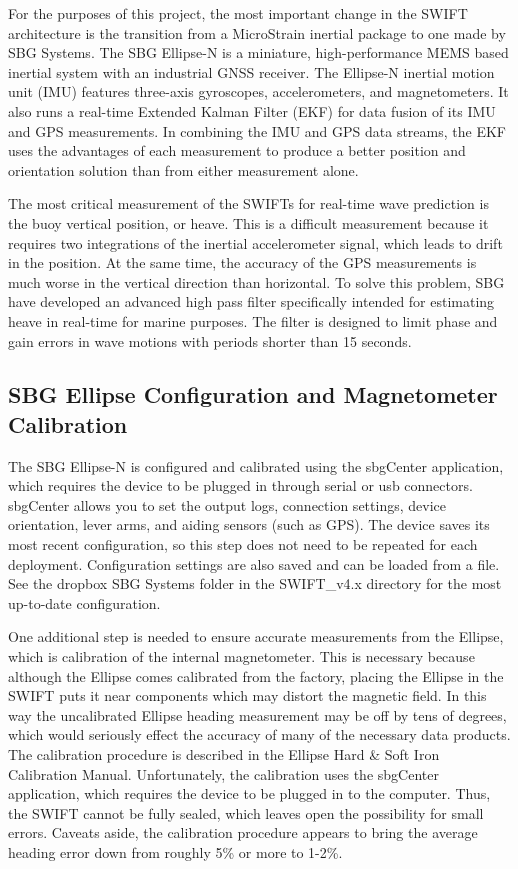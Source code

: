 \documentclass[11pt]{article}
\begin{document}
For the purposes of this project, the most important change in the SWIFT architecture is the transition from a MicroStrain inertial package to one made by SBG Systems.  The SBG Ellipse-N is a miniature, high-performance MEMS based inertial system with an industrial GNSS receiver.  The Ellipse-N inertial motion unit (IMU) features three-axis gyroscopes, accelerometers, and magnetometers.  It also runs a real-time Extended Kalman Filter (EKF) for data fusion of its IMU and GPS measurements.  In combining the IMU and GPS data streams, the EKF uses the advantages of each measurement to produce a better position and orientation solution than from either measurement alone.  

The most critical measurement of the SWIFTs for real-time wave prediction is the buoy vertical position, or heave.  This is a difficult measurement because it requires two integrations of the inertial accelerometer signal, which leads to drift in the position.  At the same time, the accuracy of the GPS measurements is much worse in the vertical direction than horizontal.  To solve this problem, SBG have developed an advanced high pass filter specifically intended for estimating heave in real-time for marine purposes.  The filter is designed to limit phase and gain errors in wave motions with periods shorter than 15 seconds.

\subsection{SBG Ellipse Configuration and Magnetometer Calibration}
The SBG Ellipse-N is configured and calibrated using the sbgCenter application, which requires the device to be plugged in through serial or usb connectors.  sbgCenter allows you to set the output logs, connection settings, device orientation, lever arms, and aiding sensors (such as GPS).  The device saves its most recent configuration, so this step does not need to be repeated for each deployment.  Configuration settings are also saved and can be loaded from a file. See the dropbox SBG Systems folder in the SWIFT\_v4.x directory for the most up-to-date configuration.

One additional step is needed to ensure accurate measurements from the Ellipse, which is calibration of the internal magnetometer.  This is necessary because although the Ellipse comes calibrated from the factory, placing the Ellipse in the SWIFT puts it near components which may distort the magnetic field.  In this way the uncalibrated Ellipse heading measurement may be off by tens of degrees, which would seriously effect the accuracy of many of the necessary data products.  The calibration procedure is described in the Ellipse Hard \& Soft Iron Calibration Manual.  Unfortunately, the calibration uses the sbgCenter application, which requires the device to be plugged in to the computer.  Thus, the SWIFT cannot be fully sealed, which leaves open the possibility for small errors.  Caveats aside, the calibration procedure appears to bring the average heading error down from roughly 5\% or more to 1-2\%.
\end{document}
